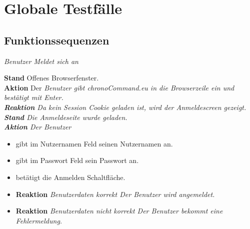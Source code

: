 \section{Globale Testfälle}

\subsection{Funktionssequenzen}
\begin{requirements}
	 \em Benutzer \em Meldet sich an
	\begin{requirements}
  			    \textbf{Stand} Offenes Browserfenster. \\
  			    \textbf{Aktion} Der \em Benutzer \em gibt chronoCommand.eu in die Browserzeile ein und bestätigt mit Enter. \\
  			    \textbf{Reaktion} Da kein Session Cookie geladen ist, wird der Anmeldescreen gezeigt.
  			    \textbf{Stand} Die Anmeldeseite wurde geladen.\\
                \textbf{Aktion} Der \em Benutzer \em
                    \begin{itemize}
                        \item gibt im Nutzernamen Feld seinen Nutzernamen an.
                        \item gibt im Passwort Feld sein Passwort an.
                        \item betätigt die Anmelden Schaltfläche.
                    \end{itemize}
                \begin{itemize}
			\item \textbf{Reaktion} \em Benutzerdaten korrekt \em Der \em Benutzer \em wird angemeldet.
			\item \textbf{Reaktion} \em Benutzerdaten nicht korrekt \em Der \em Benutzer \em bekommt eine Fehlermeldung.
                \end{itemize}


\end{requirements}
\end{requirements}
